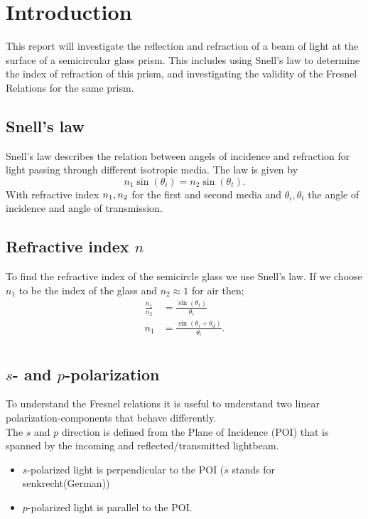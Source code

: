 \chapter{Introduction}
This report will investigate the reflection and refraction of a beam of light at the surface of a semicircular glass prism. 
This includes using Snell's law to determine the index of refraction of this prism, and investigating the validity of the Fresnel Relations for the same prism.
    \section{Snell's law}
        Snell's law describes the relation between angels of incidence and refraction for light passing through different isotropic media. The law is given by
        \begin{equation*}
            n_1 \sin(\theta_i) = n_2 \sin(\theta_t). \tag{Snell's law}
        \end{equation*}
        With refractive index $n_{\textup{1}},n_{\textup{2}}$ for the first and second media and $\theta_i,\theta_t$ the angle of incidence and angle of transmission.
    \section{Refractive index $n$}
        To find the refractive index of the semicircle glass we use Snell's law.
        If we choose $n_1$ to be the index of the glass and $n_2 \approx 1$ for air then;
        \begin{align*}
            \frac{n_1}{n_2} &= \frac{\sin(\theta_t)}{\theta_i}\\
            n_1 &= \frac{\sin(\theta_i+\theta_d)}{\theta_i}.\\
        \end{align*}
        \vspace*{-4em}
    \section{$s$- and $p$-polarization}
        To understand the Fresnel relations it is useful to understand two linear polarization-components that behave differently.\\
        The $s$ and $p$ direction is defined from the Plane of Incidence (POI) that is spanned by the incoming and reflected/transmitted lightbeam.
        \begin{itemize}
            \item $s$-polarized light is perpendicular to the POI ($s$ stands for senkrecht(German))
            \item $p$-polarized light is parallel to the POI.
        \end{itemize}
    
